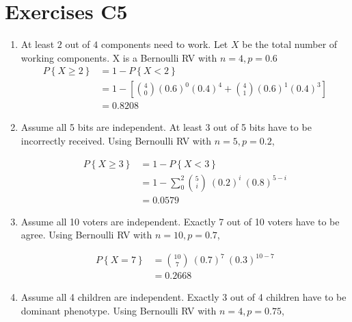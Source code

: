 \chapter*{Exercises C5}

\begin{enumerate}
	\item At least $ 2 $ out of $ 4 $ components need to work. Let $ X $ be the total number of working components. X is a Bernoulli RV with $ n = 4, p = 0.6 $\\
	
	\begin{subequations}
		\begin{align}
			P \left\{X \geq 2 \right\} &= 1 - P \left\{X < 2 \right\} \\
			&= 1 - \left[\binom{4}{0} (0.6)^0 (0.4)^4 + \binom{4}{1} (0.6)^1 (0.4)^3\right] \nonumber \\
			&= 0.8208 \nonumber
		\end{align}
	\end{subequations}

	\item Assume all 5 bits are independent.  At least 3 out of 5 bits have to be incorrectly received. Using Bernoulli RV with $ n = 5, p = 0.2 $,
	
	\begin{subequations}
		\begin{align}
			P \left\{X \geq 3 \right\} &= 1 - P \left\{X < 3 \right\} \\
			&= 1 - \sum\limits_{0}^{2} \binom{5}{i}\ (0.2)^i\ (0.8)^{5-i} \nonumber \\
			&= 0.0579 \nonumber
		\end{align}
	\end{subequations}

	\item Assume all 10 voters are independent.  Exactly 7 out of 10 voters have to be agree. Using Bernoulli RV with $ n = 10, p = 0.7 $,
	
	\begin{subequations}
		\begin{align}
			P \left\{X = 7 \right\} &= \binom{10}{7}\ (0.7)^7\ (0.3)^{10-7}  \\
			&= 0.2668 \nonumber
		\end{align}
	\end{subequations} 

	\item Assume all 4 children are independent. Exactly 3 out of 4 children have to be dominant phenotype. Using Bernoulli RV with $ n = 4, p = 0.75 $,
	

\end{enumerate}
